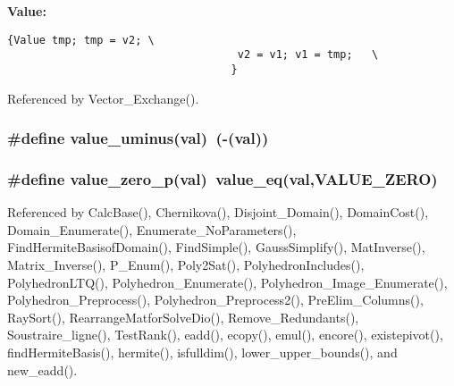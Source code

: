 {\bf Value:}

\footnotesize\begin{verbatim}{Value tmp; tmp = v2; \
                                    v2 = v1; v1 = tmp;   \
                                   }\end{verbatim}\normalsize 


Referenced by Vector\_\-Exchange().

\subsubsection{\setlength{\rightskip}{0pt plus 5cm}\#define value\_\-uminus(val)\ (-(val))}\label{arithmetique_8h_a60}


\subsubsection{\setlength{\rightskip}{0pt plus 5cm}\#define value\_\-zero\_\-p(val)\ value\_\-eq(val,VALUE\_\-ZERO)}\label{arithmetique_8h_a67}




Referenced by Calc\-Base(), Chernikova(), Disjoint\_\-Domain(), Domain\-Cost(), Domain\_\-Enumerate(), Enumerate\_\-No\-Parameters(), Find\-Hermite\-Basisof\-Domain(), Find\-Simple(), Gauss\-Simplify(), Mat\-Inverse(), Matrix\_\-Inverse(), P\_\-Enum(), Poly2Sat(), Polyhedron\-Includes(), Polyhedron\-LTQ(), Polyhedron\_\-Enumerate(), Polyhedron\_\-Image\_\-Enumerate(), Polyhedron\_\-Preprocess(), Polyhedron\_\-Preprocess2(), Pre\-Elim\_\-Columns(), Ray\-Sort(), Rearrange\-Matfor\-Solve\-Dio(), Remove\_\-Redundants(), Soustraire\_\-ligne(), Test\-Rank(), eadd(), ecopy(), emul(), encore(), existepivot(), find\-Hermite\-Basis(), hermite(), isfulldim(), lower\_\-upper\_\-bounds(), and new\_\-eadd().

